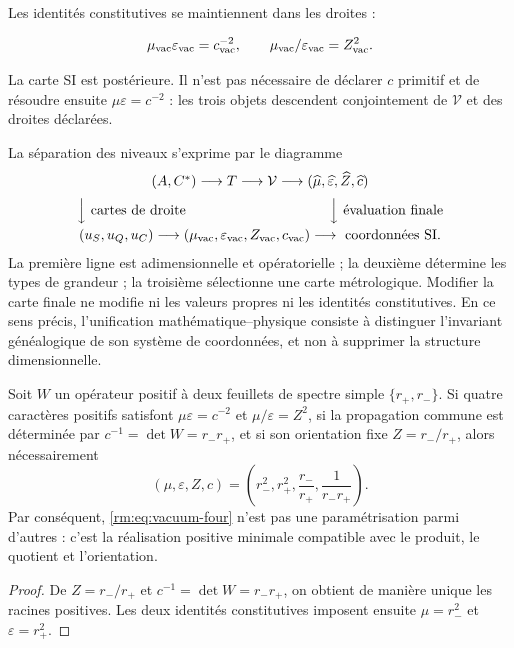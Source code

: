Les identités constitutives se maintiennent dans les droites :

\begin{equation}
\mu_{\rm vac}\varepsilon_{\rm vac}=c_{\rm vac}^{-2},
\qquad
\mu_{\rm vac}/\varepsilon_{\rm vac}=Z_{\rm vac}^2.
\end{equation}

La carte SI est postérieure. Il n'est pas nécessaire de déclarer \(c\) primitif et de résoudre ensuite \(\mu\varepsilon=c^{-2}\) : les trois objets descendent conjointement de \(\mathcal V\) et des droites déclarées.

La séparation des niveaux s'exprime par le diagramme
\[
\begin{array}{c}
(A,C^*)\longrightarrow T\longrightarrow\mathcal V
\longrightarrow
(\widehat\mu,\widehat\varepsilon,\widehat Z,\widehat c)
\\[2mm]
\Big\downarrow\text{ cartes de droite}\hspace{36mm}
\Big\downarrow\text{ évaluation finale}
\\[2mm]
(u_S,u_Q,u_C)\longrightarrow
(\mu_{\rm vac},\varepsilon_{\rm vac},Z_{\rm vac},c_{\rm vac})
\longrightarrow\text{ coordonnées SI}.
\end{array}
\]
La première ligne est adimensionnelle et opératorielle ; la deuxième détermine les types de
grandeur ; la troisième sélectionne une carte métrologique. Modifier la carte finale
ne modifie ni les valeurs propres ni les identités constitutives. En ce
sens précis, l'unification mathématique--physique consiste à distinguer
l'invariant généalogique de son système de coordonnées, et non à supprimer la
structure dimensionnelle.

\begin{proposition}
Soit \(W\) un opérateur positif à deux feuillets de spectre simple
\(\{r_+,r_-\}\). Si quatre caractères positifs satisfont
\(\mu\varepsilon=c^{-2}\) et \(\mu/\varepsilon=Z^2\), si la propagation
commune est déterminée par \(c^{-1}=\det W=r_-r_+\), et si son orientation
fixe \(Z=r_-/r_+\), alors nécessairement
\[
(\mu,\varepsilon,Z,c)
=\left(r_-^2,r_+^2,\frac{r_-}{r_+},\frac1{r_-r_+}\right).
\]
Par conséquent, \cref{rm:eq:vacuum-four} n'est pas une paramétrisation parmi d'autres :
c'est la réalisation positive minimale compatible avec le produit, le quotient et
l'orientation.
\end{proposition}

\begin{proof}
De \(Z=r_-/r_+\) et \(c^{-1}=\det W=r_-r_+\), on obtient de manière unique les
racines positives. Les deux identités constitutives imposent ensuite
\(\mu=r_-^2\) et \(\varepsilon=r_+^2\).
\end{proof}


